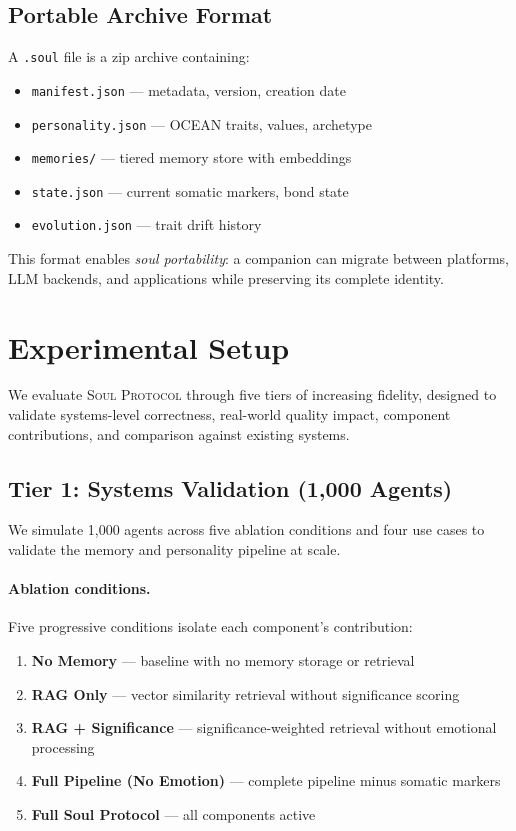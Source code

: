 \documentclass{article}
\newcommand{\soul}{\textsc{Soul Protocol}}
\newcommand{\soulfile}{\texttt{.soul}}
\begin{document}
\subsection{Portable Archive Format}

A \soulfile{} file is a zip archive containing:
\begin{itemize}[leftmargin=*, topsep=2pt, itemsep=1pt]
  \item \texttt{manifest.json} --- metadata, version, creation date
  \item \texttt{personality.json} --- OCEAN traits, values, archetype
  \item \texttt{memories/} --- tiered memory store with embeddings
  \item \texttt{state.json} --- current somatic markers, bond state
  \item \texttt{evolution.json} --- trait drift history
\end{itemize}

This format enables \textit{soul portability}: a companion can migrate between platforms, LLM backends, and applications while preserving its complete identity.


\section{Experimental Setup}
\label{sec:experiments}

We evaluate \soul{} through five tiers of increasing fidelity, designed to validate systems-level correctness, real-world quality impact, component contributions, and comparison against existing systems.

\subsection{Tier 1: Systems Validation (1,000 Agents)}

We simulate 1,000 agents across five ablation conditions and four use cases to validate the memory and personality pipeline at scale.

\paragraph{Ablation conditions.} Five progressive conditions isolate each component's contribution:

\begin{enumerate}[leftmargin=*, topsep=2pt, itemsep=1pt]
  \item \textbf{No Memory} --- baseline with no memory storage or retrieval
  \item \textbf{RAG Only} --- vector similarity retrieval without significance scoring
  \item \textbf{RAG + Significance} --- significance-weighted retrieval without emotional processing
  \item \textbf{Full Pipeline (No Emotion)} --- complete pipeline minus somatic markers
  \item \textbf{Full Soul Protocol} --- all components active
\end{enumerate}
\end{document}
